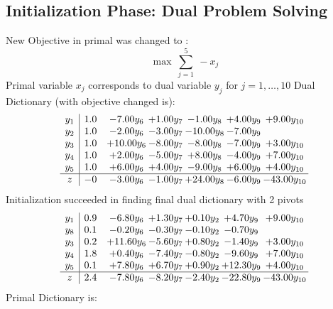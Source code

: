 \documentclass[9pt]{article}
\begin{document}
\subsection{Initialization Phase: Dual Problem Solving}
New Objective in primal was changed to : \[ \max\ \sum_{j=1}^{5}\ - x_j \] 
Primal variable $x_j$ corresponds to dual variable $y_j$ for $j = 1,\ldots,10$
Dual Dictionary (with objective changed is): 
\[\begin{array}{c| c c@{\hskip 2pt} c@{\hskip 2pt} c@{\hskip 2pt} c@{\hskip 2pt} c@{\hskip 2pt} }
 y_{1}   &  1.0 & -7.00 y_{6} & +  1.00 y_{7} & -1.00 y_{8} & +  4.00 y_{9} & +  9.00 y_{10}\\
 y_{2}   &  1.0 & -2.00 y_{6} & -3.00 y_{7} & -10.00 y_{8} & -7.00 y_{9} &   \\
 y_{3}   &  1.0 & + 10.00 y_{6} & -8.00 y_{7} & -8.00 y_{8} & -7.00 y_{9} & +  3.00 y_{10}\\
 y_{4}   &  1.0 & +  2.00 y_{6} & -5.00 y_{7} & +  8.00 y_{8} & -4.00 y_{9} & +  7.00 y_{10}\\
 y_{5}   &  1.0 & +  6.00 y_{6} & +  4.00 y_{7} & -9.00 y_{8} & +  6.00 y_{9} & +  4.00 y_{10}\\
\hline
z    &  -0 & -3.00 y_{6} & -1.00 y_{7} & + 24.00 y_{8} & -6.00 y_{9} & -43.00 y_{10}\\
\end{array}\]
Initialization succeeded in finding final dual dictionary with 2 pivots
\[\begin{array}{c| c c@{\hskip 2pt} c@{\hskip 2pt} c@{\hskip 2pt} c@{\hskip 2pt} c@{\hskip 2pt} }
 y_{1}   &  0.9 & -6.80 y_{6} & +  1.30 y_{7} & +  0.10 y_{2} & +  4.70 y_{9} & +  9.00 y_{10}\\
 y_{8}   &  0.1 & -0.20 y_{6} & -0.30 y_{7} & -0.10 y_{2} & -0.70 y_{9} &   \\
 y_{3}   &  0.2 & + 11.60 y_{6} & -5.60 y_{7} & +  0.80 y_{2} & -1.40 y_{9} & +  3.00 y_{10}\\
 y_{4}   &  1.8 & +  0.40 y_{6} & -7.40 y_{7} & -0.80 y_{2} & -9.60 y_{9} & +  7.00 y_{10}\\
 y_{5}   &  0.1 & +  7.80 y_{6} & +  6.70 y_{7} & +  0.90 y_{2} & + 12.30 y_{9} & +  4.00 y_{10}\\
\hline
z    &  2.4 & -7.80 y_{6} & -8.20 y_{7} & -2.40 y_{2} & -22.80 y_{9} & -43.00 y_{10}\\
\end{array}\]
Primal Dictionary is:
\end{document}
